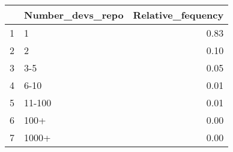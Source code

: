 \begin{table}[ht]
\centering
\begin{tabular}{rlr}
  \hline
 & Number\_devs\_repo & Relative\_fequency \\ 
  \hline
1 & 1 & 0.83 \\ 
  2 & 2 & 0.10 \\ 
  3 & 3-5 & 0.05 \\ 
  4 & 6-10 & 0.01 \\ 
  5 & 11-100 & 0.01 \\ 
  6 & 100+ & 0.00 \\ 
  7 & 1000+ & 0.00 \\ 
   \hline
\end{tabular}
\end{table}
